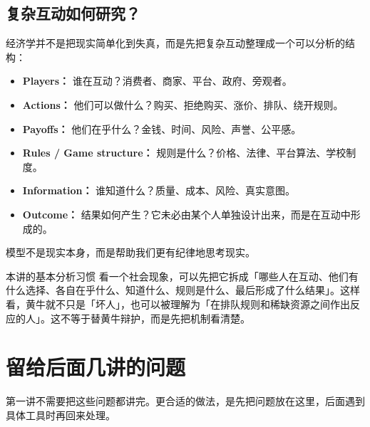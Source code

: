 \documentclass[10pt,a4paper]{ctexart}
\begin{document}
\subsection{复杂互动如何研究？}

经济学并不是把现实简单化到失真，而是先把复杂互动整理成一个可以分析的结构：

\begin{itemize}
  \item \textbf{Players：} 谁在互动？消费者、商家、平台、政府、旁观者。
  \item \textbf{Actions：} 他们可以做什么？购买、拒绝购买、涨价、排队、绕开规则。
  \item \textbf{Payoffs：} 他们在乎什么？金钱、时间、风险、声誉、公平感。
  \item \textbf{Rules / Game structure：} 规则是什么？价格、法律、平台算法、学校制度。
  \item \textbf{Information：} 谁知道什么？质量、成本、风险、真实意图。
  \item \textbf{Outcome：} 结果如何产生？它未必由某个人单独设计出来，而是在互动中形成的。
\end{itemize}

模型不是现实本身，而是帮助我们更有纪律地思考现实。

\begin{insightbox}{本讲的基本分析习惯}
看一个社会现象，可以先把它拆成「哪些人在互动、他们有什么选择、各自在乎什么、知道什么、规则是什么、最后形成了什么结果」。这样看，黄牛就不只是「坏人」，也可以被理解为「在排队规则和稀缺资源之间作出反应的人」。这不等于替黄牛辩护，而是先把机制看清楚。
\end{insightbox}

\section{留给后面几讲的问题}

第一讲不需要把这些问题都讲完。更合适的做法，是先把问题放在这里，后面遇到具体工具时再回来处理。
\end{document}
